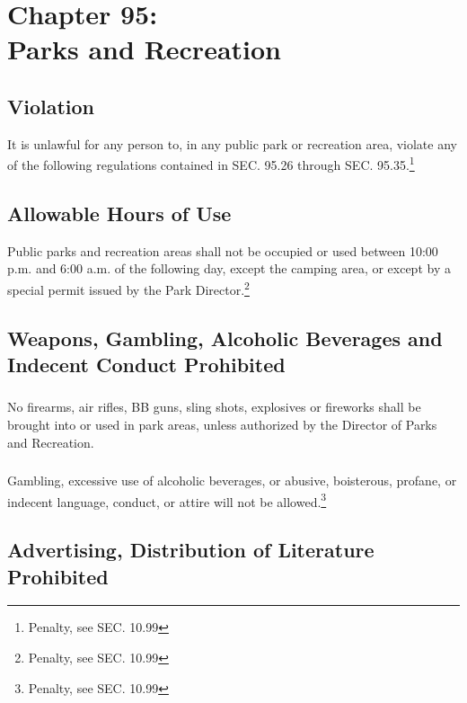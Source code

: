 \chapter*{Chapter 95: \\
	Parks and Recreation}
    \vfill
    \minitoc
    \pagebreak


\setcounter{section}{24}
\section{Violation}
It is unlawful for any person to, in any public park or recreation area, violate any of the following regulations contained in SEC. 95.26 through SEC. 95.35.\footnote{Penalty, see SEC. 10.99}

\section{Allowable Hours of Use}
Public parks and recreation areas shall not be occupied or used between 10:00 p.m. and 6:00 a.m. of the following day, except the camping area, or except by a special permit issued by the Park Director.\footnote{Penalty, see SEC. 10.99}

\section{Weapons, Gambling, Alcoholic Beverages and Indecent Conduct Prohibited}
\subsection{}
No firearms, air rifles, BB guns, sling shots, explosives or fireworks shall be brought into or used in park areas, unless authorized by the Director of Parks and Recreation.
\subsection{}
Gambling, excessive use of alcoholic beverages, or abusive, boisterous, profane, or indecent language, conduct, or attire will not be allowed.\footnote{Penalty, see SEC. 10.99}

\section{Advertising, Distribution of Literature Prohibited}
